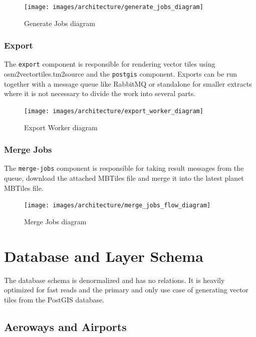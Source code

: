 \begin{figure}[H]
  \centering
  \texttt{[image: images/architecture/generate\_jobs\_diagram]}
  \caption{Generate Jobs diagram}
\end{figure}
\clearpage

\subsubsection{Export}

The \texttt{export} component is responsible for rendering vector tiles using osm2vectortiles.tm2source and the \texttt{postgis} component. Exports can be run together with a message queue like RabbitMQ or standalone for smaller extracts where it is not necessary to divide the work into several parts.

\begin{figure}[H]
  \centering
  \texttt{[image: images/architecture/export\_worker\_diagram]}
  \caption{Export Worker diagram}
\end{figure}

\subsubsection{Merge Jobs}

The \texttt{merge-jobs} component is responsible for taking result messages from the queue, download the attached MBTiles file and merge it into the latest planet MBTiles file.

\begin{figure}[H]
  \centering
  \texttt{[image: images/architecture/merge\_jobs\_flow\_diagram]}
  \caption{Merge Jobs diagram}
\end{figure}

\newpage
\section{Database and Layer Schema}\label{database-schema}

The database schema is denormalized and has no relations. It is heavily optimized for fast reads and the primary and only use case of generating vector tiles from the PostGIS database.

\subsection{Aeroways and Airports}

